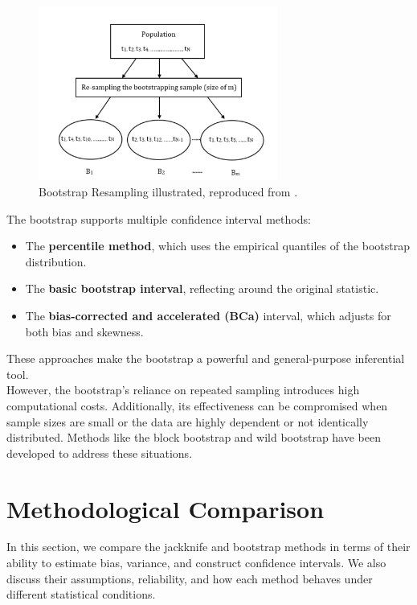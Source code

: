 \documentclass{article}
\begin{document}
\begin{figure}[h!]
\centering
\includegraphics[width=0.7\textwidth]{Screenshot 2025-05-04 at 19.59.04} 
\caption{Bootstrap Resampling illustrated, reproduced from \cite{probe-speed-2019}.}
\label{fig:jackknife-sd}
\end{figure}

The bootstrap supports multiple confidence interval methods:
\begin{itemize}
  \item The \textbf{percentile method}, which uses the empirical quantiles of the bootstrap distribution.
  \item The \textbf{basic bootstrap interval}, reflecting around the original statistic.
  \item The \textbf{bias-corrected and accelerated (BCa)} interval, which adjusts for both bias and skewness.
\end{itemize}

These approaches make the bootstrap a powerful and general-purpose inferential tool. \\

However, the bootstrap's reliance on repeated sampling introduces high computational costs. Additionally, its effectiveness can be compromised when sample sizes are small or the data are highly dependent or not identically distributed. Methods like the block bootstrap and wild bootstrap have been developed to address these situations. \\


\section{Methodological Comparison}

In this section, we compare the jackknife and bootstrap methods in terms of their ability to estimate bias, variance, and construct confidence intervals. We also discuss their assumptions, reliability, and how each method behaves under different statistical conditions. \\
\end{document}
